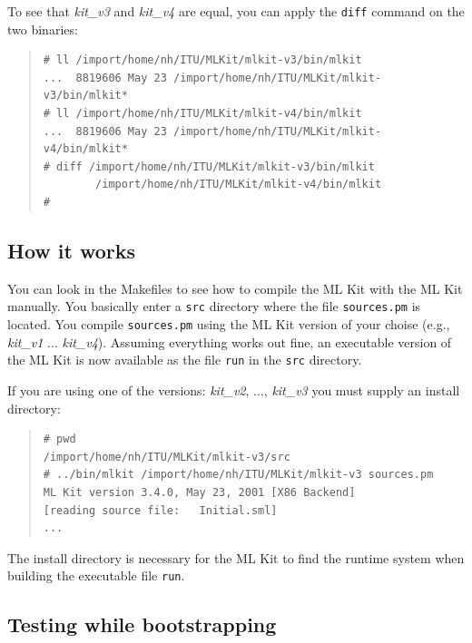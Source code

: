 \documentclass[12pt]{book}
\begin{document}
To see that \emph{kit\_v3} and \emph{kit\_v4} are equal, you can apply
the \texttt{diff} command on the two binaries:

\begin{small}
\begin{quote}
\begin{verbatim}
# ll /import/home/nh/ITU/MLKit/mlkit-v3/bin/mlkit 
...  8819606 May 23 /import/home/nh/ITU/MLKit/mlkit-v3/bin/mlkit*
# ll /import/home/nh/ITU/MLKit/mlkit-v4/bin/mlkit
...  8819606 May 23 /import/home/nh/ITU/MLKit/mlkit-v4/bin/mlkit*
# diff /import/home/nh/ITU/MLKit/mlkit-v3/bin/mlkit 
        /import/home/nh/ITU/MLKit/mlkit-v4/bin/mlkit
#
\end{verbatim}
\end{quote}
\end{small}

\subsection{How it works}

You can look in the Makefiles to see how to compile the ML Kit with
the ML Kit manually. You basically enter a \texttt{src} directory
where the file \texttt{sources.pm} is located. You compile
\texttt{sources.pm} using the ML Kit version of your choise (e.g.,
\emph{kit\_v1} $\ldots$ \emph{kit\_v4}). Assuming everything works out
fine, an executable version of the ML Kit is now available as the file
{\tt run} in the \texttt{src} directory.

If you are using one of the versions: \emph{kit\_v2}, $\ldots$,
\emph{kit\_v3} you must supply an install directory:

\begin{small}
\begin{quote}
\begin{verbatim}
# pwd
/import/home/nh/ITU/MLKit/mlkit-v3/src
# ../bin/mlkit /import/home/nh/ITU/MLKit/mlkit-v3 sources.pm
ML Kit version 3.4.0, May 23, 2001 [X86 Backend]
[reading source file:   Initial.sml]
...
\end{verbatim}
\end{quote}
\end{small}

The install directory is necessary for the ML Kit to find the runtime
system when building the executable file \texttt{run}.

\subsection{Testing while bootstrapping}
\end{document}
